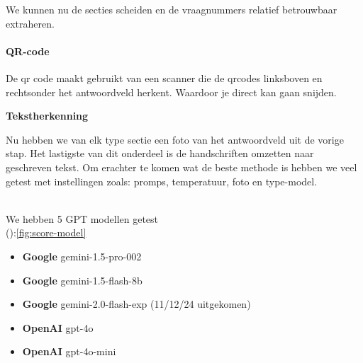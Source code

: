 \documentclass[12pt]{article}
\begin{document}
\begin{samepage}
\begin{longtable}{@{}p{0.25\linewidth}|p{0.375\linewidth}|p{0.375\linewidth}}
           \\
\end{longtable}


\noindent We kunnen nu de secties scheiden en de vraagnummers relatief betrouwbaar extraheren.
\paragraph*{QR-code}De qr code maakt gebruikt van een scanner die de qrcodes linksboven en rechtsonder het antwoordveld herkent. Waardoor je direct kan gaan snijden.\\
\end{samepage}


\pagebreak

\noindent
\textbf{Tekstherkenning}
\begin{multicols}{2}
Nu hebben we van elk type sectie een foto van het antwoordveld uit de vorige stap. Het lastigste van dit onderdeel is de handschriften omzetten naar geschreven tekst. Om erachter te komen wat de beste methode is hebben we veel getest met instellingen zoals: promps, temperatuur, foto en type-model.\\
\\
\begin{minipage}{\textwidth}
We hebben 5 GPT modellen getest\\ (\cite{geminiproManual, openaiManual}):\ref{fig:score-model}
\begin{itemize}
    \item \textbf{Google} gemini-1.5-pro-002
    \item \textbf{Google} gemini-1.5-flash-8b
    \item \textbf{Google} gemini-2.0-flash-exp \newline (11/12/24 uitgekomen)
    \item \textbf{OpenAI} gpt-4o
    \item \textbf{OpenAI} gpt-4o-mini
\end{itemize}
\end{minipage}


\end{multicols}
\end{document}

